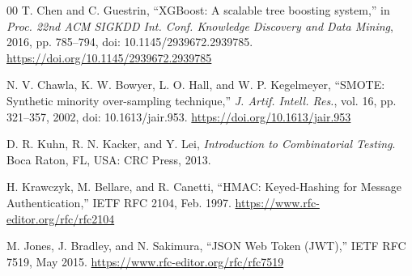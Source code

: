 \documentclass[11pt,a4paper]{article}
\begin{document}
\begin{thebibliography}{00}
T. Chen and C. Guestrin, ``XGBoost: A scalable tree boosting system,'' in \emph{Proc. 22nd ACM SIGKDD Int. Conf. Knowledge Discovery and Data Mining}, 2016, pp. 785--794, doi: 10.1145/2939672.2939785. \url{https://doi.org/10.1145/2939672.2939785}

N. V. Chawla, K. W. Bowyer, L. O. Hall, and W. P. Kegelmeyer, ``SMOTE: Synthetic minority over-sampling technique,'' \emph{J. Artif. Intell. Res.}, vol. 16, pp. 321--357, 2002, doi: 10.1613/jair.953. \url{https://doi.org/10.1613/jair.953}

D. R. Kuhn, R. N. Kacker, and Y. Lei, \emph{Introduction to Combinatorial Testing}. Boca Raton, FL, USA: CRC Press, 2013.

H. Krawczyk, M. Bellare, and R. Canetti, ``HMAC: Keyed-Hashing for Message Authentication,'' IETF RFC 2104, Feb. 1997. \url{https://www.rfc-editor.org/rfc/rfc2104}

M. Jones, J. Bradley, and N. Sakimura, ``JSON Web Token (JWT),'' IETF RFC 7519, May 2015. \url{https://www.rfc-editor.org/rfc/rfc7519}

\end{thebibliography}
\end{document}
